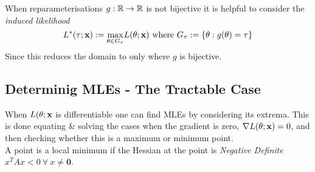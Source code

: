 \documentclass[11pt,a4paper]{article}
\begin{document}
When reparameterisations $g:\mathbb{R}\to\mathbb{R}$ is not bijective it is helpful to consider the \textit{induced likelihood}
$$L^*(\tau;\x):=\underset{\theta\in G_\tau}{\text{max}}L(\theta;\x)\ \mathrm{where}\ G_\tau:=\{\theta:g(\theta)=\tau\}$$
Since this reduces the domain to only where $g$ is bijective.

\subsection{Determinig MLEs - The Tractable Case}

When $L(\theta;\textbf{x}$ is differentiable one can find MLEs by considering its extrema. This is done equating \& solving the cases when the gradient is zero, \ie $\nabla L(\theta;\textbf{x})=0$, and then checking whether this is a maximum or minimum point.\\
A point is a local minimum if the Hessian at the point is \textit{Negative Definite} \ie $x^TAx<0\ \forall\ x\neq\pmb{0}$.\\
\end{document}
